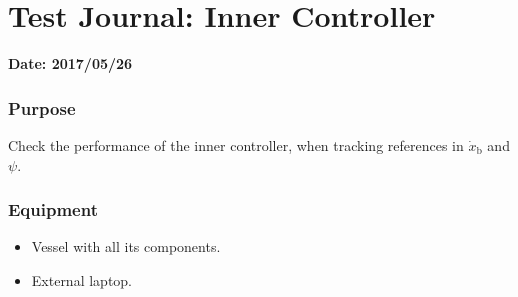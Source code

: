 \chapter{Test Journal: Inner Controller} \label{app:Inner}

\textbf{Date: 2017/05/26}

\subsection*{Purpose}
Check the performance of the inner controller, when tracking references in $\dot{x}_\mathrm{b}$ and $\psi$.

\subsection*{Equipment}
\begin{itemize}
    \item Vessel with all its components. 
    \item External laptop.
\end{itemize}


